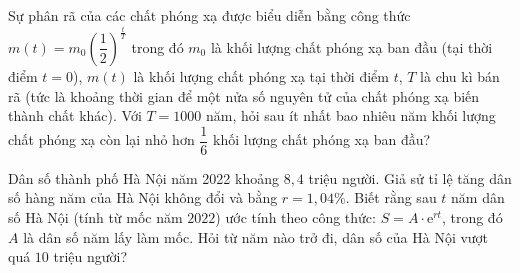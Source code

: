 \begin{baitap}
	Sự phân rã của các chất phóng xạ được biểu diễn bằng công thức $m(t)=m_0\left(\dfrac{1}{2}\right)^{\tfrac{t}{T}}$ trong đó $m_0$ là khối lượng chất phóng xạ ban đầu (tại thời điểm $t = 0$), $m(t)$ là khối lượng chất phóng xạ tại thời điểm $t$, $T$ là chu kì bán rã (tức là khoảng thời gian để một nửa số nguyên tử của chất phóng xạ biến thành chất khác). Với $T=1000$ năm, hỏi sau ít nhất bao nhiêu năm khối lượng chất phóng xạ còn lại nhỏ hơn $\dfrac{1}{6}$ khối lượng chất phóng xạ ban đầu?
\end{baitap}

\begin{baitap}
	Dân số thành phố Hà Nội năm 2022 khoảng $8{,}4$ triệu người. Giả sử tỉ lệ tăng dân số hàng năm của Hà Nội không đổi và bằng $r=1{,}04\%$. Biết rằng sau $t$ năm dân số Hà Nội (tính từ mốc năm $2022$) ước tính theo công thức: $S = A\cdot \mathrm{e}^{rt}$, trong đó $A$ là dân số năm lấy làm mốc. Hỏi từ năm nào trở đi, dân số của Hà Nội vượt quá $10$ triệu người?
\end{baitap}

